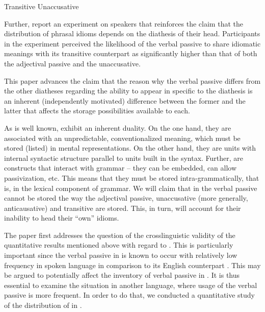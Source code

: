 \documentclass[output=paper]{langsci/langscibook}
\begin{document}
\ea\label{ex:key:20.3} 
    \ea Transitive
    \ex Unaccusative
    \z
\z

Further, \textcite{SilHorKluWex2018} report an experiment on 
speakers that reinforces the claim that the distribution of phrasal idioms
depends on the diathesis of their head. Participants in the experiment
perceived the likelihood of the verbal passive to share idiomatic meanings with
its transitive counterpart as significantly higher than that of both the
adjectival passive and the unaccusative.

This paper advances the claim that the reason why the verbal passive differs
from the other diatheses regarding the ability to appear in  specific to
the diathesis is an inherent (independently motivated) difference between the
former and the latter that affects the storage possibilities available to each.

As is well known,  exhibit an inherent duality. On the one hand, they are
associated with an unpredictable, conventionalized meaning, which must be
stored (listed) in mental representations. On the other hand, they are units
with internal syntactic structure parallel to units built in the syntax.
Further,  are constructs that interact with grammar – they can be
embedded, can allow passivization, etc. This means that they must be stored
intra-grammatically, that is, in the lexical component of grammar. We will
claim that  in the verbal passive cannot be stored the way the adjectival
passive, unaccusative (more generally, anticausative) and transitive  are
stored. This, in turn, will account for their inability to head their \enquote{own}
idioms.

The paper first addresses the question of the crosslinguistic validity of the
quantitative results mentioned above with regard to . This is
particularly important since the verbal passive in  is known to
occur with relatively low frequency in spoken language in comparison to its
English counterpart \citep{Berman2008}. This may be argued to potentially
affect the inventory of verbal passive  in . It is thus
essential to examine the situation in another language, where usage of the
verbal passive is more frequent. In order to do that, we conducted a
quantitative study of the distribution of  in .
\end{document}
